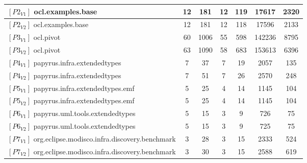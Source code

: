 \begin{table}[t]
{\begin{tabular}{lcccccc}
			$[P2_{V1}]$ ocl.examples.base & 12 & 181 & 12 &119 &17617 & 2320 \\ \midrule
			
			$[P2_{V2}]$ ocl.examples.base & 12 & 181 & 12 & 118&17596 & 2133 \\ \midrule
			
			
			$[P3_{V1}]$ ocl.pivot & 60 & 1006 & 55 &598 & 142236& 8795 \\ \midrule
			
			$[P3_{V2}]$ ocl.pivot & 63 & 1090 & 58 & 683&153613 & 6396 \\ \midrule
			
			
			$[P4_{V1}]$ papyrus.infra.extendedtypes & 7 & 37 &7  & 19 & 2057 & 135 \\ \midrule
			
			$[P4_{V2}]$ papyrus.infra.extendedtypes & 7 & 51 & 7 &26 &  2570 & 248 \\\midrule
			$[P5_{V1}]$ papyrus.infra.extendedtypes.emf & 5 & 25 &4  & 14 & 1145 & 104 \\ \midrule
			
			$[P5_{V2}]$ papyrus.infra.extendedtypes.emf & 5 & 25 & 4 &14 &  1145& 104 \\ \midrule
			$[P6_{V1}]$ papyrus.uml.tools.extendedtypes & 5 & 15 &3  & 9 & 726 & 75 \\ \midrule
			
			$[P6_{V2}]$ papyrus.uml.tools.extendedtypes & 5 & 15 & 3 &9 &  725& 75 \\ \midrule
			
			$[P7_{V1}]$ org.eclipse.modisco.infra.discovery.benchmark & 3 &  28& 3 &15 & 2333 &524  \\ \midrule
			
			$[P7_{V2}]$ org.eclipse.modisco.infra.discovery.benchmark &3  & 30 &3  & 15&  2588& 619 \\%
			

\end{tabular}}
\end{table}
